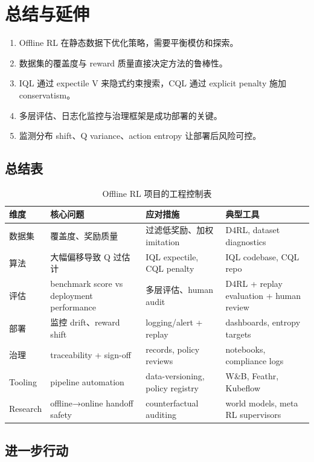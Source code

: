 \section{总结与延伸}

\begin{enumerate}
    \item Offline RL 在静态数据下优化策略，需要平衡模仿和探索。
    \item 数据集的覆盖度与 reward 质量直接决定方法的鲁棒性。
    \item IQL 通过 expectile V 来隐式约束搜索，CQL 通过 explicit penalty 施加 conservatism。
    \item 多层评估、日志化监控与治理框架是成功部署的关键。
    \item 监测分布 shift、Q variance、action entropy 让部署后风险可控。
\end{enumerate}

\subsection{总结表}

\begin{table}[H]
\centering
\begin{tabular}{p{} p{} p{} p{}}
\toprule
维度 & 核心问题 & 应对措施 & 典型工具 \\
\midrule
数据集 & 覆盖度、奖励质量 & 过滤低奖励、加权 imitation & D4RL, dataset diagnostics \\
算法 & 大幅偏移导致 Q 过估计 & IQL expectile, CQL penalty & IQL codebase, CQL repo \\
评估 & benchmark score vs deployment performance & 多层评估、human audit & D4RL + replay evaluation + human review \\
部署 & 监控 drift、reward shift & logging/alert + replay & dashboards, entropy targets \\
治理 & traceability + sign-off & records, policy reviews & notebooks, compliance logs \\
Tooling & pipeline automation & data-versioning, policy registry & W\&B, Feathr, Kubeflow \\
Research & offline→online handoff safety & counterfactual auditing & world models, meta RL supervisors \\
\bottomrule
\end{tabular}
\caption{Offline RL 项目的工程控制表}
\end{table}

\subsection{进一步行动}

